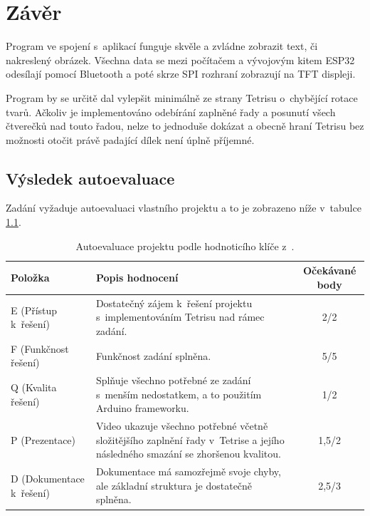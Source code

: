 \chapter{Závěr}

Program ve spojení s~aplikací \cite{AppPixelBluetoothCanvas} funguje skvěle a zvládne zobrazit text, či nakreslený obrázek. Všechna data se mezi počítačem a vývojovým kitem ESP32 odesílají pomocí Bluetooth a poté skrze SPI rozhraní zobrazují na TFT displeji.

Program by se určitě dal vylepšit minimálně ze strany Tetrisu o~chybějící rotace tvarů. Ačkoliv je implementováno odebírání zaplněné řady a posunutí všech čtverečků nad touto řadou, nelze to jednoduše dokázat a obecně hraní Tetrisu bez možnosti otočit právě padající dílek není úplně příjemné.

\section*{Výsledek autoevaluace}

Zadání vyžaduje autoevaluaci vlastního projektu a to je zobrazeno níže v~tabulce \ref{tab:autoevaluace}.

\begin{table}[h!]
    \centering
    \begin{tabular}{|l|p{62mm}|c|}
        \hline
        \textbf{Položka} & \textbf{Popis hodnocení} & \textbf{Očekávané body} \\
        \hline
        E (Přístup k~řešení)     & Dostatečný zájem k~řešení projektu s~implementováním Tetrisu nad rámec zadání. & 2/2 \\
        \hline
        F (Funkčnost řešení)     & Funkčnost zadání splněna. & 5/5 \\
        \hline
        Q (Kvalita řešení)       & Splňuje všechno potřebné ze zadání s~menším nedostatkem, a to použitím Arduino frameworku. & 1/2 \\
        \hline
        P (Prezentace)           & Video ukazuje všechno potřebné včetně složitějšího zaplnění řady v~Tetrise a jejího následného smazání se zhoršenou kvalitou. & 1,5/2 \\
        \hline
        D (Dokumentace k~řešení) & Dokumentace má samozřejmě svoje chyby, ale základní struktura je dostatečně splněna. & 2,5/3 \\
        \hline
    \end{tabular}
    \caption{Autoevaluace projektu podle hodnoticího klíče z~\cite{HodnoticiKlic}.}
    \label{tab:autoevaluace}
\end{table}
